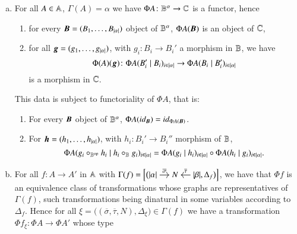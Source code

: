 \begin{enumerate}[(a),wide,labelindent=0pt]
    \item \label{PhiA} For all $A \in \mathbb A$, $\Gamma(A)=\alpha$ we have $\Phi A \colon \mathbb B^\alpha \to \mathbb C$ is a functor, hence 
    \begin{enumerate}[label=(a.\roman*),wide,leftmargin=\parindent]
        \item for every ${\boldsymbol B}=(B_1,\dots,B_{\lvert \alpha \rvert})$ object of $\mathbb B^\alpha$, $\Phi A ({\boldsymbol B})$ is an object of $\mathbb C$,\label{PhiA(B1...Balpha)}
        \item for all ${\boldsymbol g}=(g_1,\dots,g_{\lvert \alpha \rvert})$, with $g_i \colon B_i \to B_i'$ a morphism in $\mathbb B$, we have 
        \[
        \Phi(A)({\boldsymbol g}) \colon  \Phi A ({B_i'} \mid {B_i} )_{i \in \lvert \alpha \rvert} \to \Phi A ({B_i} \mid {B_i'} )_{i \in \lvert \alpha \rvert}
        \]
        is a morphism in $\mathbb C$.\label{PhiA(g1...galpha)}
    \end{enumerate}
    This data is subject to functoriality of $\Phi A$, that is:
    \begin{enumerate}[(1),wide,leftmargin=\parindent]
        \item For every ${\boldsymbol B}$ object of $\mathbb B^\alpha$, $\Phi A (\mathop{\textit{id}_{{\boldsymbol B}}}) = \mathop{\textit{id}_{\Phi A ({\boldsymbol B})}}$\label{PhiA(1...1)=1PhiA}.
        \item For ${\boldsymbol h}=(h_1,\dots,h_{\lvert \alpha \rvert})$, with $h_i \colon B_i' \to B_i''$ morphism of $\mathbb B$,
        \[
        \Phi A ({g_i \circ_{\mathbb B^{\text{op}}} h_i} \mid {h_i \circ_{\mathbb B} g_i} )_{i \in \lvert \alpha \rvert}
        =
        \Phi A ({g_i} \mid {h_i} )_{i \in \lvert \alpha \rvert} \circ \Phi A ({h_i} \mid {g_i} )_{i \in \lvert \alpha \rvert}.
        \]\label{PhiA(hg)=PhiA(h)PhiA(g)}
    \end{enumerate}
    \item \label{Phif}For all $f \colon A \to A'$ in $\mathbb A$ with
    $
    \Gamma(f) = \Bigl[\bigl(
    \begin{tikzcd}[cramped,sep=small]
    \length\alpha \ar[r,"\overline\sigma"] & N & \length\beta \ar[l,"\overline\tau"']
    \end{tikzcd},\Delta_f
    \bigr) \Bigr]
    $, we have that $\Phi f$ is an equivalence class of transformations whose graphs are representatives of $\Gamma(f)$, such transformations being dinatural in some variables according to $\Delta_f$. %
    Hence for all $\xi = \bigl((\overline\sigma, \overline\tau, N),\Delta_\xi\bigr) \in \Gamma(f)$ we have a transformation $\Phi f_\xi \colon \Phi A \to \Phi A'$ whose type

\end{enumerate}
